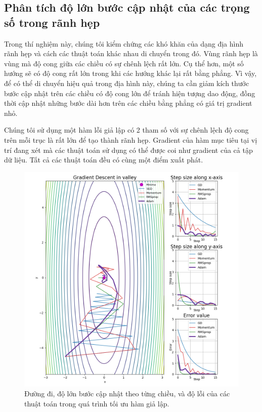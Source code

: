\subsection{Phân tích độ lớn bước cập nhật của các trọng số trong rãnh hẹp}
\label{exp:step-size}

Trong thí nghiệm này, chúng tôi kiểm chứng các khó khăn của dạng địa hình rãnh hẹp và cách các thuật toán khác nhau di chuyển trong đó. Vùng rãnh hẹp là vùng mà độ cong giữa các chiều có sự chênh lệch rất lớn. Cụ thể hơn, một số hướng sẽ có độ cong rất lớn trong khi các hướng khác lại rất bằng phẳng. Vì vậy, để có thể di chuyển hiệu quả trong địa hình này, chúng ta cần giảm kích thước bước cập nhật trên các chiều có độ cong lớn để tránh hiện tượng dao động, đồng thời cập nhật những bước dài hơn trên các chiều bằng phẳng có giá trị gradient nhỏ.

Chúng tôi sử dụng một hàm lỗi giả lập có 2 tham số với sự chênh lệch độ cong trên mỗi trục là rất lớn để tạo thành rãnh hẹp. Gradient của hàm mục tiêu tại vị trí đang xét mà các thuật toán sử dụng có thể được coi như gradient của cả tập dữ liệu. Tất cả các thuật toán đều có cùng một điểm xuất phát.

\begin{figure}[htp]
	\centering
	\includegraphics[width=140 mm]{images/step-size.png}
	\caption{Đường đi, độ lớn bước cập nhật theo từng chiều, và độ lỗi của các thuật toán trong quá trình tối ưu hàm giả lập.}
	\label{fig:aligned-step-size}
\end{figure}

